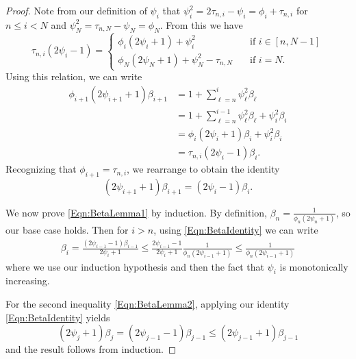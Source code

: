 \documentclass[11pt]{article}
\numberwithin{equation}{section}
\theoremstyle{definition}
\theoremstyle{plain}
\theoremstyle{definition}
\begin{document}
\begin{proof}
    Note from our definition of $\psi_i$ that $\psi_i^2 = 2 \tau_{n,i} - \psi_i = \phi_i + \tau_{n,i}$ for $n \leq i < N$ and $\psi_N^2 = \tau_{n,N} - \psi_N = \phi_N$. From this we have
    \begin{equation*}
        \tau_{n,i}(2\psi_i - 1) = \begin{cases}
            \phi_i(2\psi_i+1)+\psi_i^2 \quad & \text{if } i \in [n, N-1] \\
            \phi_N(2\psi_N+1)+\psi_N^2 - \tau_{n,N} \quad & \text{if } i = N.
        \end{cases}
    \end{equation*}
Using this relation, we can write
\begin{align*}
    \phi_{i+1}(2 \psi_{i+1} + 1) \beta_{i+1} &= 1 + \sum_{\ell = n}^i \psi_\ell^2 \beta_\ell \\
    & = 1 + \sum_{\ell = n}^{i-1} \psi_\ell^2 \beta_\ell + \psi_i^2 \beta_i \\
    & = \phi_{i}(2 \psi_{i} + 1) \beta_{i} + \psi_i^2 \beta_i \\
    & = \tau_{n,i}(2 \psi_i - 1) \beta_i.
\end{align*}
Recognizing that $\phi_{i+1} = \tau_{n,i}$, we rearrange to obtain the identity 
\begin{equation} \label{Eqn:BetaIdentity}
    (2 \psi_{i+1} + 1) \beta_{i+1} = (2 \psi_i -1) \beta_i.
\end{equation}

We now prove \eqref{Eqn:BetaLemma1} by induction. By definition, $\beta_n = \frac{1}{\phi_n(2 \psi_n+1)}$, so our base case holds. Then for $i>n$, using \eqref{Eqn:BetaIdentity} we can write
\begin{align*}
    \beta_i = \frac{(2 \psi_{i-1} -1)\beta_{i-1}}{2 \psi_i + 1} \leq \frac{2 \psi_{i-1} - 1}{2\psi_i + 1} \frac{1}{\phi_n (2 \psi_{i-1} + 1)} \leq \frac{1}{\phi_n (2 \psi_{i-1} + 1)}
\end{align*}
where we use our induction hypothesis and then the fact that $\psi_i$ is monotonically increasing.

For the second inequality \eqref{Eqn:BetaLemma2}, applying our identity \eqref{Eqn:BetaIdentity} yields
\begin{equation*}
    (2 \psi_j + 1)\beta_j = (2 \psi_{j-1} - 1) \beta_{j-1} \leq (2 \psi_{j-1} + 1) \beta_{j-1}
\end{equation*}
and the result follows from induction.
\end{proof}
\end{document}
